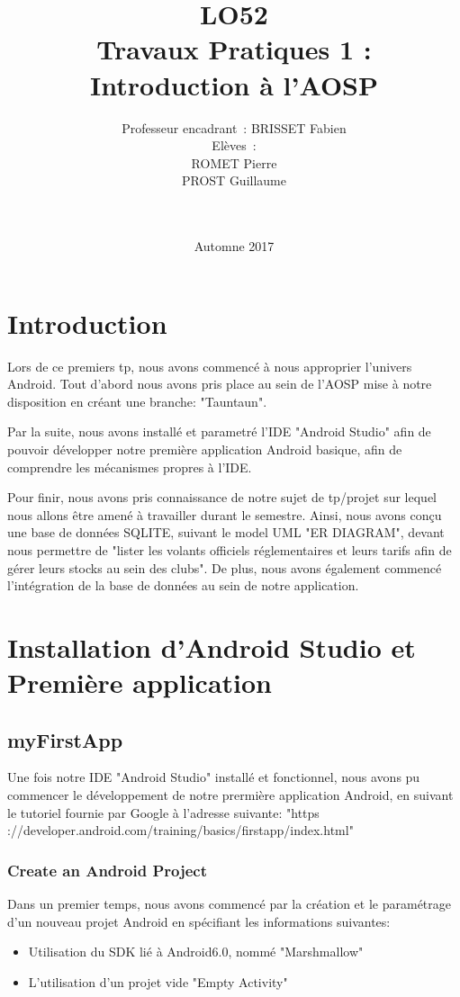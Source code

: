 \documentclass[french,a4paper,12pt]{report}
\title{LO52\\ Travaux Pratiques 1 :\\ Introduction à l'AOSP}
\author{Professeur encadrant : BRISSET Fabien \\ Elèves : \\ROMET Pierre
\\PROST Guillaume \\ \\ \\}
\date{Automne 2017}
\begin{document}
\maketitle
\tableofcontents

\chapter{Introduction}
Lors de ce premiers tp, nous avons commencé à nous approprier l'univers Android.
Tout d'abord nous avons pris place au sein de l'AOSP mise à notre disposition
en créant une branche: "Tauntaun".

Par la suite, nous avons installé et parametré l'IDE "Android Studio" afin de
pouvoir développer notre première application Android basique, afin de
comprendre les mécanismes propres à l'IDE.

Pour finir, nous avons pris connaissance de notre sujet de tp/projet sur
lequel nous allons être amené à travailler durant le semestre.
Ainsi, nous avons conçu une base de données SQLITE, suivant le model UML
"ER DIAGRAM", devant nous permettre de "lister les volants officiels
réglementaires et leurs tarifs afin de gérer leurs stocks au sein des clubs".
De plus, nous avons également commencé l'intégration de la base de données au
sein de notre application.


\chapter{Installation d'Android Studio et Première application}
\section{myFirstApp}
Une fois notre IDE "Android Studio" installé et fonctionnel, nous avons pu
commencer le développement de notre prermière application Android, en suivant
le tutoriel fournie par Google à l'adresse suivante:
"https ://developer.android.com/training/basics/firstapp/index.html"
\subsection{Create an Android Project}
Dans un premier temps, nous avons commencé par la création et le paramétrage
d'un nouveau projet Android en spécifiant les informations suivantes:
\begin{itemize}
  \item Utilisation du SDK lié à Android6.0, nommé "Marshmallow"
  \item L'utilisation d'un projet vide "Empty Activity"
\end{itemize}
\end{document}
